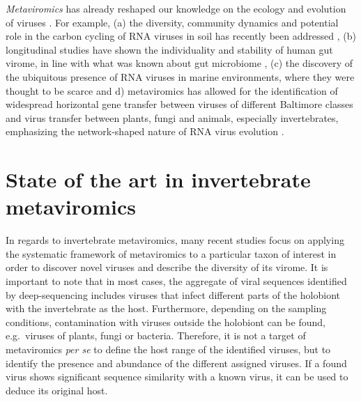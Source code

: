 \documentclass[
  openany]{book}
\begin{document}
\emph{Metaviromics} has already reshaped our knowledge on the ecology and evolution of viruses \autocite{Koonin2018}. For example, (a) the diversity, community dynamics and potential role in the carbon cycling of RNA viruses in soil has recently been addressed \autocite{Starr2019}, (b) longitudinal studies have shown the individuality and stability of human gut virome, in line with what was known about gut microbiome \autocite{Shkoporov2019}, (c) the discovery of the ubiquitous presence of RNA viruses in marine environments, where they were thought to be scarce \autocite{Culley2018} and d) metaviromics has allowed for the identification of widespread horizontal gene transfer between viruses of different Baltimore classes and virus transfer between plants, fungi and animals, especially invertebrates, emphasizing the network-shaped nature of RNA virus evolution \autocite{Wolf2018,Dolja2018}.

\hypertarget{state-of-the-art-in-invertebrate-metaviromics}{%
\section{State of the art in invertebrate metaviromics}\label{state-of-the-art-in-invertebrate-metaviromics}}

In regards to invertebrate metaviromics, many recent studies focus on applying the systematic framework of metaviromics to a particular taxon of interest in order to discover novel viruses and describe the diversity of its virome. It is important to note that in most cases, the aggregate of viral sequences identified by deep-sequencing includes viruses that infect different parts of the holobiont with the invertebrate as the host. Furthermore, depending on the sampling conditions, contamination with viruses outside the holobiont can be found, e.g.~viruses of plants, fungi or bacteria. Therefore, it is not a target of metaviromics \emph{per se} to define the host range of the identified viruses, but to identify the presence and abundance of the different assigned viruses. If a found virus shows significant sequence similarity with a known virus, it can be used to deduce its original host.
\end{document}

